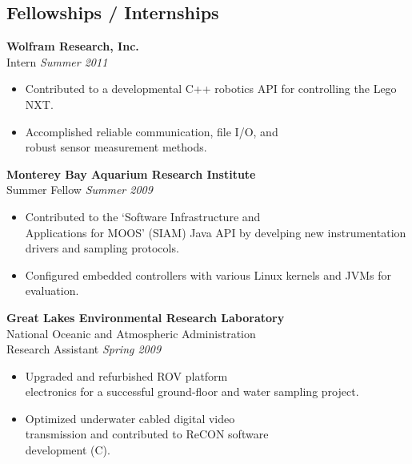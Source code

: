 \documentclass{article}
\begin{document}
{\begin{multicols}{2}
\section*{Fellowships / Internships}
\noindent
    \textbf{Wolfram Research, Inc. }\\
     Intern \hfill \textsl{Summer 2011} \\
    \vspace{ -10px}
    \begin{itemize}[noitemsep,nolistsep]
	\item Contributed to a developmental C++ robotics API for controlling the Lego NXT. 
	\item Accomplished reliable communication, file I/O, and \\robust sensor measurement methods. 
    \end{itemize}
    \vspace{5px}
    \textbf{Monterey Bay Aquarium Research Institute}\\
     Summer Fellow \hfill \textsl{Summer 2009}  \\
    \vspace{ -10px}	
    \begin{itemize}[noitemsep,nolistsep]
	\item Contributed to the `Software Infrastructure and \\Applications for MOOS' (SIAM) Java API by develping new instrumentation drivers and sampling protocols.
	\item Configured embedded controllers with various Linux kernels and JVMs for evaluation.
    \end{itemize}
    \vspace{5px}
    \textbf{Great Lakes Environmental Research Laboratory}\\
    National Oceanic and Atmospheric Administration\\
    Research Assistant \hfill \textsl{Spring 2009} \\
    \vspace{ -10px}
    \begin{itemize}[noitemsep,nolistsep]
	\item Upgraded and refurbished ROV platform \\electronics for a successful ground-floor and water sampling project.
	\item Optimized underwater cabled digital video \\transmission and contributed to ReCON software \\development (C).

\end{itemize}
\end{multicols}}
\end{document}
